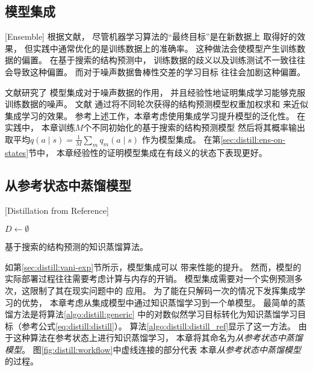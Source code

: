 \subsection{模型集成}[Ensemble]
根据文献，
尽管机器学习算法的``最终目标''是在新数据上
取得好的效果，
但实践中通常优化的是训练数据上的准确率。
这种做法会使模型产生训练数据的偏置。
在基于搜索的结构预测中，
训练数据的歧义以及训练测试不一致往往会导致这种偏置。
而对于噪声数据鲁棒性交差的学习目标
往往会加剧这种偏置。

文献研究了
模型集成对于噪声数据的作用，
并且经验性地证明集成学习能够克服训练数据的噪声。
文献
通过将不同轮次获得的结构预测模型权重加权求和
来近似集成学习的效果。
参考上述工作，本章考虑使用集成学习提升模型的泛化性。
在实践中，
本章训练$M$个不同初始化的基于搜索的结构预测模型
然后将其概率输出取平均$q(a \mid s) = \frac{1}{M} \sum_m q_m(a\mid s)$
作为模型集成。
在第\ref{sec:distill:ens-on-states}节中，
本章经验性的证明模型集成在有歧义的状态下表现更好。

\subsection{从参考状态中蒸馏模型}[Distillation from Reference]\label{sec:distill:distill_ref}

\begin{algorithm}[t]
	\wuhao
	$D \gets \emptyset$\; 
	\caption{基于搜索的结构预测的知识蒸馏算法。\label{algo:distill:distill_ref}}
\end{algorithm}

如第\ref{sec:distill:vani-exp}节所示，模型集成可以
带来性能的提升。
然而，模型的实际部署过程往往需要考虑计算与内存的开销。
模型集成需要对一个实例预测多次，这限制了其在现实问题中的
应用。
为了能在只解码一次的情况下发挥集成学习的优势，
本章考虑从集成模型中通过知识蒸馏学习到一个单模型。
最简单的蒸馏方法是将算法\ref{algo:distill:generic}
中的对数似然学习目标转化为知识蒸馏学习目标（参考公式\ref{eq:distill:distill}）。
算法\ref{algo:distill:distill_ref}显示了这一方法。
由于这种算法在参考状态上进行知识蒸馏学习，
本章将其命名为\textit{从参考状态中蒸馏模型}。
图\ref{fig:distill:workflow}中虚线连接的部分代表
本章\textit{从参考状态中蒸馏模型}的过程。

